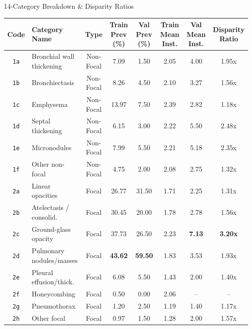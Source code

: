 \documentclass[aspectratio=169, 10pt]{beamer}
\begin{document}
\begin{frame}{14-Category Breakdown \& Disparity Ratios}
    \centering
    \tiny
    \setlength{\tabcolsep}{6pt}
    \begin{tabular}{clcccccc}
        \toprule
        \textbf{Code} & \textbf{Category Name} & \textbf{Type} & \textbf{Train Prev (\%)} & \textbf{Val Prev (\%)} & \textbf{Train Mean Inst.} & \textbf{Val Mean Inst.} & \textbf{Disparity Ratio} \\
        \midrule
        \texttt{1a} & Bronchial wall thickening & Non-Focal & 7.09 & 1.50 & 2.05 & 4.00 & 1.95x \\
        \texttt{1b} & Bronchiectasis           & Non-Focal & 8.26 & 4.50 & 2.10 & 3.27 & 1.56x \\
        \texttt{1c} & Emphysema                & Non-Focal & 13.97 & 7.50 & 2.39 & 2.82 & 1.18x \\
        \texttt{1d} & Septal thickening        & Non-Focal & 6.15 & 3.00 & 2.22 & 5.50 & 2.48x \\
        \texttt{1e} & Micronodules             & Non-Focal & 7.99 & 5.50 & 2.21 & 5.18 & 2.35x \\
        \texttt{1f} & Other non-focal          & Non-Focal & 4.75 & 2.00 & 2.08 & 2.75 & 1.32x \\
        \midrule
        \texttt{2a} & Linear opacities         & Focal & 26.77 & 31.50 & 1.71 & 2.25 & 1.31x \\
        \texttt{2b} & Atelectasis / consolid.  & Focal & 30.45 & 20.00 & 1.78 & 2.78 & 1.56x \\
        \rowcolor{blue!10}
        \texttt{2c} & Ground-glass opacity     & Focal & 37.73 & 26.50 & 2.23 & \textbf{7.13} & \textbf{3.20x} \\
        \texttt{2d} & Pulmonary nodules/masses & Focal & \textbf{43.62} & \textbf{59.50} & 1.83 & 3.53 & 1.93x \\
        \texttt{2e} & Pleural effusion/thick.  & Focal & 6.08 & 5.50 & 1.43 & 2.00 & 1.40x \\
        \texttt{2f} & Honeycombing             & Focal & 0.50 & 0.00 & 2.06 & -- & -- \\
        \texttt{2g} & Pneumothorax             & Focal & 1.20 & 2.50 & 1.19 & 1.40 & 1.17x \\
        \texttt{2h} & Other focal              & Focal & 0.97 & 1.50 & 1.28 & 2.00 & 1.57x \\
        \bottomrule
    \end{tabular}


\end{frame}
\end{document}
